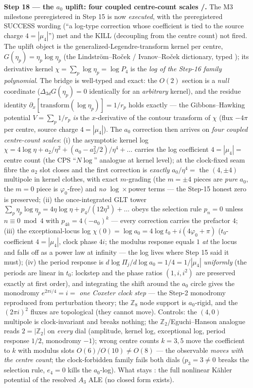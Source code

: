 \documentclass[11pt,a4paper]{article}
\newcommand{\Z}{\mathbb{Z}}
\theoremstyle{definition}
\begin{document}
\par\smallskip\noindent\textbf{Step 18 --- the $a_0$ uplift: four coupled centre-count scales
\mE/\mC.} The M3 milestone preregistered in Step 15 is now \emph{executed}, with the
preregistered SUCCESS wording (``a log-type correction whose coefficient is tied to the source
charge $4=|\mu_4|$'') met and the KILL (decoupling from the centre count) not fired. The uplift
object is the generalized-Legendre-transform kernel per centre, $G(\eta_p)=\eta_p\log\eta_p$
(the Lindstr\"om--Ro\v{c}ek / Ivanov--Ro\v{c}ek dictionary, typed \mC); its derivative kernel
$\chi=\sum_p\log\eta_p=\log P_4$ is the \emph{log of the Step-16 family polynomial}. The bridge
is well-typed and exact: the $O(2)$ section is a \emph{null} coordinate ($\Delta_{3d}G(\eta_p)=0$
identically for an \emph{arbitrary} kernel), and the residue identity
$\partial_x[\mathrm{transform}(\log\eta_p)]=1/r_p$ holds exactly --- the Gibbons--Hawking
potential $V=\sum_p1/r_p$ \emph{is} the $x$-derivative of the contour transform of $\chi$ (flux
$-4\pi$ per centre, source charge $4=|\mu_4|$). The $a_0$ correction then arrives on \emph{four
coupled centre-count scales}: (i) the asymptotic kernel log
$\chi=4\log\eta+a_2/\eta^2+(a_0-a_2^2/2)/\eta^4+\dots$ carries the log coefficient $4=|\mu_4|=$
centre count (the CPS ``$N\log$'' analogue at kernel level); at the clock-fixed seam fibre the
$a_2$ slot closes and the first correction is \emph{exactly} $a_0/\eta^4=$ the $(4,\pm4)$
multipole in kernel clothes, with exact $m$-grading (the $m=\pm4$ pieces are \emph{pure} $a_0$,
the $m=0$ piece is $\varphi_0$-free) and \emph{no} $\log\times$power terms --- the Step-15
honest zero is preserved; (ii) the once-integrated GLT tower $\sum_p\eta_p\log\eta_p=
4\eta\log\eta+p_4/(12\eta^3)+\dots$ obeys the selection rule $p_n=0$ unless $n\equiv0\bmod4$
with $p_{4k}=4(-a_0)^k$ --- every correction carries the prefactor $4$; (iii) the
exceptional-locus log $\chi(0)=\log a_0=4\log t_0+i(4\varphi_0+\pi)$ ($t_0$-coefficient
$4=|\mu_4|$, clock phase $4i$; the modulus response equals $1$ \emph{at} the locus and falls off
as a power law at infinity --- the log lives where Step 15 said it must); (iv) the period
response is $d\log\Pi_j/d\log a_0=1/4=1/|\mu_4|$ \emph{uniformly} (the periods are linear in
$t_0$: lockstep and the phase ratios $(1,i,i^2)$ are preserved exactly at first order), and
integrating the shift around the $a_0$ circle gives the monodromy $e^{2\pi i/4}=i=$ \emph{one
Coxeter clock step} --- the Step-2 monodromy reproduced from perturbation theory; the $\Z_8$
node support is $a_0$-rigid, and the $(2\pi i)^2$ fluxes are topological (they cannot move).
Controls: the $(4,0)$ multipole is clock-invariant and breaks nothing; the $\Z_2$/Eguchi--Hanson
analogue reads $2=|\Z_2|$ on \emph{every} dial (amplitude, kernel log, exceptional log, period
response $1/2$, monodromy $-1$); wrong centre counts $k=3,5$ move the coefficient to $k$ with
modulus slots $O(6)/O(10)\neq O(8)$ --- the observable \emph{moves with the centre count}; the
clock-forbidden family fails both dials ($p_3=3\neq0$ breaks the selection rule, $e_4=0$ kills
the $a_0$-log). What stays \mO: the full nonlinear K\"ahler potential of the resolved $A_3$ ALE
(no closed form exists).
\end{document}
